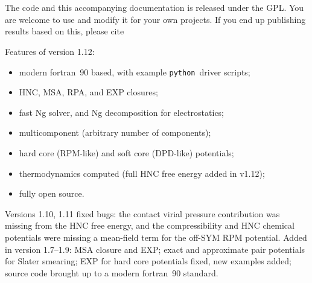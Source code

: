 \documentclass[12pt,a4paper]{article}
\newcommand{\FORTRAN}{{\sc fortran}}
\newcommand{\python}{{\tt python}}
\begin{document}
\\[6pt]
\\[6pt]

\noindent The code and this accompanying documentation is released
under the GPL.  You are welcome to use and modify it for your own
projects. If you end up publishing results based on this, please cite\\
%
\begin{center}
\end{center}

\vspace{0.25in}

\noindent Features of version 1.12:
\begin{itemize}
\item modern \FORTRAN\ 90 based, with example \python\ driver scripts;
\item HNC, MSA, RPA, and EXP closures;
\item fast Ng solver, and Ng decomposition for electrostatics;
\item multicomponent (arbitrary number of components);
\item hard core (RPM-like) and soft core (DPD-like) potentials;
\item thermodynamics computed (full HNC free energy added in v1.12);
\item fully open source.
\end{itemize}

\noindent
{\small Versions 1.10, 1.11 fixed bugs: the
contact virial pressure contribution was missing from the HNC free
energy, and the compressibility and HNC chemical potentials were
missing a mean-field term for the off-SYM RPM potential.
Added in version 1.7--1.9: MSA closure and EXP; exact and approximate
pair potentials for Slater smearing; EXP for hard core potentials
fixed, new examples added; source code brought up to a modern
\FORTRAN\ 90 standard.}

\newpage
{\small\tableofcontents}
\newpage
\end{document}

